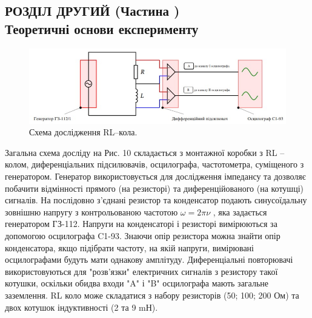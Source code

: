 \documentclass[a4paper,12pt]{article}
\newcommand{\RomanNumeralCaps}[1]{\MakeUppercase{\romannumeral #1}}
\begin{document}
\newpage
	\begin{center}
		\section* {РОЗДІЛ ДРУГИЙ (Частина \RomanNumeralCaps{2})\\Теоретичні основи експерименту}
	\end{center}
    \begin{figure}[h!]
		\begin{center}
			\includegraphics[scale=0.8]{Prt sc/Shema_7.jpg}
		\end{center}
		\caption{Схема дослідження RL–кола.}
		\label{Picture_7}
	\end{figure}
    Загальна схема досліду на Рис. 10 складається з монтажної коробки з RL – колом, 
    диференціальних підсилювачів, осцилографа, частотометра, суміщеного з 
    генератором. Генератор використовується для дослідження імпедансу та дозволяє
    побачити відмінності прямого (на резисторі) та диференційованого (на котушці) сигналів.
    На послідовно з’єднані резистор та конденсатор подають синусоїдальну
    зовнішню напругу з контрольованою частотою $\omega=2\pi\nu$ , яка задається генератором 
    ГЗ-112. Напруги на конденсаторі і резисторі вимірюються за допомогою
    осцилографа C1-93. Знаючи опір резистора можна знайти опір конденсатора, якщо 
    підібрати частоту, на якій напруги, вимірювані осцилографами будуть мати 
    однакову амплітуду. Диференціальні повторювачі використовуються для 
    "розв’язки" електричних сигналів з резистору такої котушки, оскільки обидва входи "A" і "B"  осцилографа мають загальне заземлення. RL коло може складатися з 
    набору резисторів (50; 100; 200 Ом) та двох котушок індуктивності (2 та 9 mН).
\end{document}
